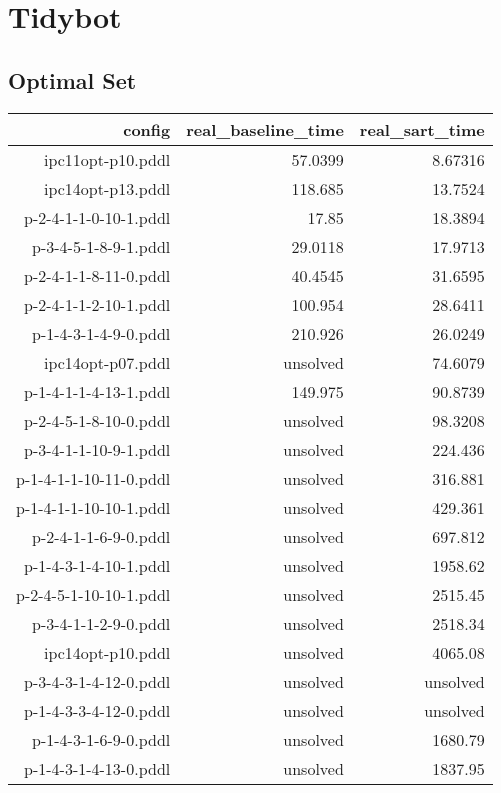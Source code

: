 \documentclass{article}
\begin{document}
                \newpage \section{Tidybot}
                    \subsection*{Optimal Set}
                    
                            \begin{center}
                            \scriptsize
                            \begin{tabular}{r|r|r}
                            config & real\_baseline\_time & real\_sart\_time\\\midrule
                             ipc11opt-p10.pddl&57.0399&8.67316\\
 ipc14opt-p13.pddl&118.685&13.7524\\
 p-2-4-1-1-0-10-1.pddl&17.85&18.3894\\
 p-3-4-5-1-8-9-1.pddl&29.0118&17.9713\\
 p-2-4-1-1-8-11-0.pddl&40.4545&31.6595\\
 p-2-4-1-1-2-10-1.pddl&100.954&28.6411\\
 p-1-4-3-1-4-9-0.pddl&210.926&26.0249\\
 ipc14opt-p07.pddl&unsolved&74.6079\\
 p-1-4-1-1-4-13-1.pddl&149.975&90.8739\\
 p-2-4-5-1-8-10-0.pddl&unsolved&98.3208\\
 p-3-4-1-1-10-9-1.pddl&unsolved&224.436\\
 p-1-4-1-1-10-11-0.pddl&unsolved&316.881\\
 p-1-4-1-1-10-10-1.pddl&unsolved&429.361\\
 p-2-4-1-1-6-9-0.pddl&unsolved&697.812\\
 p-1-4-3-1-4-10-1.pddl&unsolved&1958.62\\
 p-2-4-5-1-10-10-1.pddl&unsolved&2515.45\\
 p-3-4-1-1-2-9-0.pddl&unsolved&2518.34\\
 ipc14opt-p10.pddl&unsolved&4065.08\\
 p-3-4-3-1-4-12-0.pddl&unsolved&unsolved\\
 p-1-4-3-3-4-12-0.pddl&unsolved&unsolved\\
 p-1-4-3-1-6-9-0.pddl&unsolved&1680.79\\
 p-1-4-3-1-4-13-0.pddl&unsolved&1837.95\\

\end{tabular}
\end{center}
\end{document}
